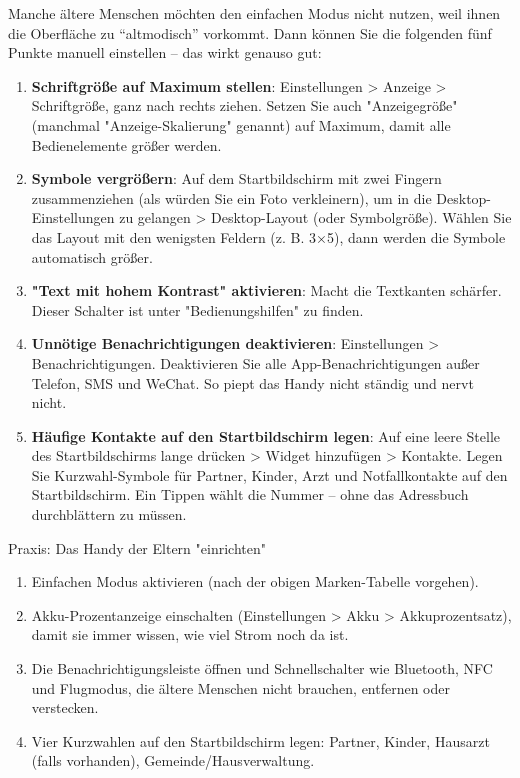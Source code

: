 
Manche ältere Menschen möchten den einfachen Modus nicht nutzen, weil ihnen die Oberfläche zu “altmodisch” vorkommt. Dann können Sie die folgenden fünf Punkte manuell einstellen – das wirkt genauso gut:

\begin{enumerate}
  \item \textbf{Schriftgröße auf Maximum stellen}: Einstellungen > Anzeige > Schriftgröße, ganz nach rechts ziehen. Setzen Sie auch "Anzeigegröße" (manchmal "Anzeige-Skalierung" genannt) auf Maximum, damit alle Bedienelemente größer werden.
  \item \textbf{Symbole vergrößern}: Auf dem Startbildschirm mit zwei Fingern zusammenziehen (als würden Sie ein Foto verkleinern), um in die Desktop-Einstellungen zu gelangen > Desktop-Layout (oder Symbolgröße). Wählen Sie das Layout mit den wenigsten Feldern (z. B. 3×5), dann werden die Symbole automatisch größer.
  \item \textbf{"Text mit hohem Kontrast" aktivieren}: Macht die Textkanten schärfer. Dieser Schalter ist unter "Bedienungshilfen" zu finden.
  \item \textbf{Unnötige Benachrichtigungen deaktivieren}: Einstellungen > Benachrichtigungen. Deaktivieren Sie alle App-Benachrichtigungen außer Telefon, SMS und WeChat. So piept das Handy nicht ständig und nervt nicht.
  \item \textbf{Häufige Kontakte auf den Startbildschirm legen}: Auf eine leere Stelle des Startbildschirms lange drücken > Widget hinzufügen > Kontakte. Legen Sie Kurzwahl-Symbole für Partner, Kinder, Arzt und Notfallkontakte auf den Startbildschirm. Ein Tippen wählt die Nummer – ohne das Adressbuch durchblättern zu müssen.
\end{enumerate}

\begin{tcbpractice}{Praxis: Das Handy der Eltern "einrichten"}
\begin{enumerate}
  \item Einfachen Modus aktivieren (nach der obigen Marken-Tabelle vorgehen).
  \item Akku-Prozentanzeige einschalten (Einstellungen > Akku > Akkuprozentsatz), damit sie immer wissen, wie viel Strom noch da ist.
  \item Die Benachrichtigungsleiste öffnen und Schnellschalter wie Bluetooth, NFC und Flugmodus, die ältere Menschen nicht brauchen, entfernen oder verstecken.
  \item Vier Kurzwahlen auf den Startbildschirm legen: Partner, Kinder, Hausarzt (falls vorhanden), Gemeinde/Hausverwaltung.
\end{enumerate}

\end{tcbpractice}

